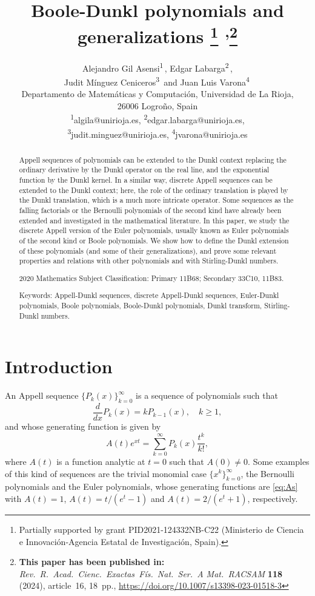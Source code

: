 \documentclass[11pt]{article}
\title{Boole-Dunkl polynomials and generalizations%
\footnote{Partially supported by grant PID2021-124332NB-C22 
(Mi\-nis\-te\-rio de Cien\-cia e Inno\-va\-ci\'on-Agen\-cia Esta\-tal de Inves\-ti\-ga\-ci\'on, Spain).}
\textsuperscript{,}\thanks{\textbf{This paper has been published in:} \textit{Rev.\ R.\ Acad.\ Cienc.\ Exactas\ F\'is.\ Nat.\ Ser.\ A Mat.\ RACSAM} \textbf{118} (2024), article~16, 18~pp., \url{https://doi.org/10.1007/s13398-023-01518-3}}}
\author{Alejandro Gil Asensi\textsuperscript{1}\,\orcidlink{0009-0007-9667-0744}, 
Edgar Labarga\textsuperscript{2}\,\orcidlink{0000-0003-1017-869X}, \\
Judit M\'inguez Ceniceros\textsuperscript{3}\,\orcidlink{0000-0002-9840-5772}
and Juan Luis Varona\textsuperscript{4}\,\orcidlink{0000-0002-2023-9946}\\[6pt]
  \small Departamento de Matem\'aticas y
  Computaci\'on, Universidad de La Rioja,\\[-2pt]
  \small 26006 Logro\~no, Spain\\[3pt]
  \small 
  \textsuperscript{1}{algila@unirioja.es},
  \textsuperscript{2}{edgar.labarga@unirioja.es},\\
  \small 
  \textsuperscript{3}{judit.minguez@unirioja.es},
  \textsuperscript{4}{jvarona@unirioja.es}
}
\date{}
\theoremstyle{plain}
\theoremstyle{remark}
\numberwithin{equation}{section} %
\begin{document}

\maketitle

\begin{abstract}
Appell sequences of polynomials can be extended to the Dunkl context replacing the ordinary derivative by the Dunkl operator on the real line, and the exponential function by the Dunkl kernel. In a similar way, discrete Appell sequences can be extended to the Dunkl context; here, the role of the ordinary translation is played by the Dunkl translation, which is a much more intricate operator. Some sequences as the falling factorials or the Bernoulli polynomials of the second kind have already been extended and investigated in the mathematical literature. In this paper, we study the discrete Appell version of the Euler polynomials, usually known as Euler polynomials of the second kind or Boole polynomials. We show how to define the Dunkl extension of these polynomials (and some of their generalizations), and prove some relevant properties and relations with other polynomials and with Stirling-Dunkl numbers. 

2020 Mathematics Subject Classification: Primary 11B68; Secondary 33C10, 11B83.

Keywords: Appell-Dunkl sequences, discrete Appell-Dunkl sequences, Euler-Dunkl polynomials, Boole polynomials, Boole-Dunkl polynomials, Dunkl transform, Stirling-Dunkl numbers.
\end{abstract}

\section{Introduction}
\label{sec:intro}

An Appell sequence $\{P_k(x)\}_{k=0}^{\infty}$ is a sequence of polynomials such that 
\begin{equation}
\label{eq:A}
  \frac{d}{dx} P_k(x) = k P_{k-1}(x), \quad k \ge 1,
\end{equation}
and whose generating function is given by 
\begin{equation}
\label{eq:As}
  A(t) e^{xt} = \sum_{k=0}^{\infty} P_k(x) \frac{t^k}{k!},
\end{equation}
where $A(t)$ is a function analytic at $t=0$ such that $A(0) \ne 0$. Some examples of this kind of sequences are the trivial monomial case $\{x^k\}_{k=0}^{\infty}$, the Bernoulli polynomials and the Euler polynomials,
whose generating functions are \eqref{eq:As} with $A(t)=1$, $A(t)=t/(e^t-1)$ and $A(t)=2/(e^t+1)$, respectively.
\end{document}
